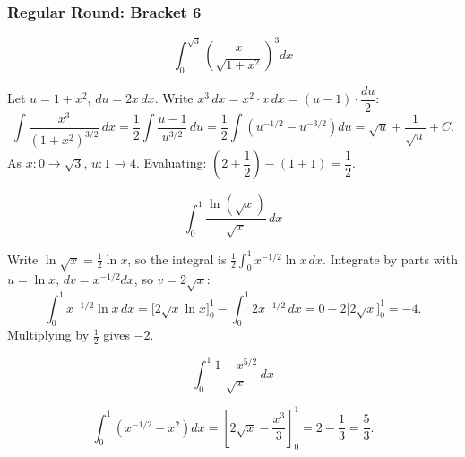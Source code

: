 \subsubsection*{Regular Round: Bracket 6}
\begin{questions}

\question \[\int_0^{\sqrt3} \left(\frac{x}{\sqrt{1+x^2}}\right)^3 dx\]
\begin{solution}
Let $u=1+x^2$, $du=2x\,dx$. Write $x^3\,dx=x^2\cdot x\,dx=(u-1)\cdot\dfrac{du}{2}$:
\[
\int \frac{x^3}{(1+x^2)^{3/2}}\,dx=\frac12\int\frac{u-1}{u^{3/2}}\,du=\frac12\int\left(u^{-1/2}-u^{-3/2}\right)du=\sqrt u+\frac1{\sqrt u}+C.
\]
As $x:0\to\sqrt3$, $u:1\to4$. Evaluating: $\left(2+\dfrac12\right)-\left(1+1\right)=\dfrac12$.
\end{solution}

\question \[\int_0^1 \frac{\ln(\sqrt{x})}{\sqrt{x}}\,dx\]
\begin{solution}
Write $\ln\sqrt x=\tfrac12\ln x$, so the integral is $\tfrac12\displaystyle\int_0^1 x^{-1/2}\ln x\,dx$.
Integrate by parts with $u=\ln x,\,dv=x^{-1/2}dx$, so $v=2\sqrt x$:
\[
\int_0^1 x^{-1/2}\ln x\,dx=\Big[2\sqrt x\ln x\Big]_0^1-\int_0^1 2x^{-1/2}\,dx=0-2\Big[2\sqrt x\Big]_0^1=-4.
\]
Multiplying by $\tfrac12$ gives $-2$.
\end{solution}

\question \[\int_0^1 \frac{1-x^{5/2}}{\sqrt{x}}\,dx\]
\begin{solution}
\[
\int_0^1\left(x^{-1/2}-x^2\right)dx=\left[2\sqrt x-\frac{x^3}{3}\right]_0^1=2-\frac13=\frac53.
\]
\end{solution}

\end{questions}

